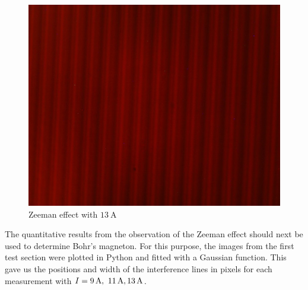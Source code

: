 \begin{figure}[ht]
\centering
\includegraphics[scale=.14]{images//interference.jpg}
\caption{Zeeman effect with $\SI{13}{\ampere}$}
\label{fig:interference}
\end{figure}
The quantitative results from the observation of the Zeeman effect should next be used to determine Bohr's magneton.
For this purpose, the images from the first test section were plotted in Python and fitted with a Gaussian function.
This gave us the positions and width of the interference lines in pixels for each measurement with $I =\SIlist{9;11;13}{\ampere}$.
